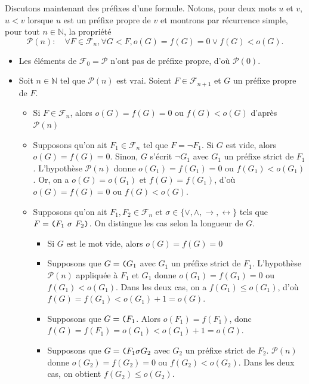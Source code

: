 \documentclass[./main]{subfiles}
\begin{document}
\begin{prv}
    Discutons maintenant des préfixes d'une formule.
    Notons, pour deux mots $u$ et $v$, $u < v$ lorsque $u$ est un préfixe propre de $v$ et montrons par récurrence simple, pour tout $n \in \mathds{N}$, la propriété
    \[\mathcal{P}(n) : \quad \forall F \in \mathcal{F}_n, \forall G < F, o(G) = f(G) = 0 \lor f(G) < o(G).\]
    \begin{itemize}
      \item Les éléments de $\mathcal{F}_0 = \mathcal{P}$ n'ont pas de préfixe propre, d'où $\mathcal{P}(0)$.
      \item Soit $n \in \mathds{N}$ tel que $\mathcal{P}(n)$ est vrai.
        Soient $F \in \mathcal{F}_{n+1}$ et $G$ un préfixe propre de $F$.
        \begin{itemize}
          \item Si $F \in \mathcal{F}_n$, alors $o(G) = f(G) = 0$ ou $f(G) < o(G)$ d'après $\mathcal{P}(n)$
          \item Supposons qu'on ait $F_1 \in \mathcal{F}_n$ tel que $F = \lnot F_1$.
            Si $G$ est vide, alors $o(G) = f(G) = 0$.
            Sinon, $G$ s'écrit $\lnot G_1$ avec $G_1$ un préfixe strict de $F_1$.
            L'hypothèse $\mathcal{P}(n)$ donne $o(G_1) = f(G_1) = 0$ ou $f(G_1) < o(G_1)$.
            Or, on a $o(G) = o(G_1)$ et $f(G) = f(G_1)$, d'où $o(G) = f(G) = 0$ ou $f(G) < o(G)$.
          \item Supposons qu'on ait $F_1, F_2 \in \mathcal{F}_n$ et $\sigma \in \{\lor, \land, \to, \leftrightarrow\}$ tels que $F = \verb|(| F_1\ \sigma\ F_2 \verb|)|$.
            On distingue les cas selon la longueur de $G$.
            \begin{itemize}
              \item Si $G$ est le mot vide, alors $o(G) = f(G) = 0$
              \item Supposons que $G = \verb|(| G_1$ avec $G_1$ un préfixe strict de $F_1$.
                L'hypothèse $\mathcal{P}(n)$ appliquée à $F_1$ et $G_1$ donne $o(G_1) = f(G_1) = 0$ ou $f(G_1) < o(G_1)$.
                Dans les deux cas, on a $f(G_1) \le o(G_1)$, d'où $f(G) = f(G_1) < o(G_1) + 1 = o(G)$.
              \item Supposons que $G = \verb|(| F_1$. Alors $o(F_1) = f(F_1)$, donc $f(G) = f(F_1) = o(G_1) < o(G_1) + 1 = o(G)$.
              \item Supposons que $G = \verb|(| F_1 \sigma G_2$ avec $G_2$ un préfixe strict de $F_2$.
                $\mathcal{P}(n)$ donne $o(G_2) = f(G_2) = 0$ ou $f(G_2) < o(G_2)$.
                Dans les deux cas, on obtient $f(G_2) \le o(G_2)$.

\end{itemize}
\end{itemize}
\end{itemize}
\end{prv}
\end{document}
